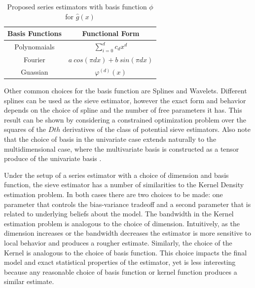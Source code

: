 \documentclass[12pt]{article}  %
\begin{document}
\begin{table}[h]
\begin{center}
\begin{tabular}{|c|c|}
\hline
Basis Functions & Functional Form\\
\hline
Polynomaials & $\sum_{i=0}^{d} c_d x^d$\\
Fourier &$a~cos(\pi d x) + b~sin(\pi d x)$\\
Guassian &$\varphi^{(d)}(x)$\\
\hline
\end{tabular}
\caption {Proposed series estimators with basis function $\phi$ for $\hat{g}(x)$ }
\label{tab:basis}
\end{center}
\end{table}

Other common choices for the basis function are Splines and Wavelets.  Different splines can be used as the sieve estimator, however the exact form and behavior depends on the choice of spline and the number of free parameters it has.  This result can be shown by considering a constrained optimization problem over the squares of the $Dth$ derivatives of the class of potential sieve estimators. Also note that the choice of basis in the univariate case extends naturally to the multidimensional case, where the multivariate basis is constructed as a tensor produce of the univariate basis \cite{Chen}.

Under the setup of a series estimator with a choice of dimension and basis function, the sieve estimator has a number of similarities to the Kernel Density estimation problem.  In both cases there are two choices to be made: one parameter that controls the bias-variance tradeoff and a second parameter that is related to underlying beliefs about the model.  The bandwidth in the Kernel estimation problem is analogous to the choice of dimension. Intuitively, as the dimension increases or the bandwidth decreases the estimator is more sensitive to local behavior and produces a rougher estimate. Similarly, the choice of the Kernel is analogous to the choice of basis function. This choice impacts the final model and exact statistical properties of the estimator, yet is less interesting because any reasonable choice of basis function or kernel function produces a similar estimate. 
\end{document}
